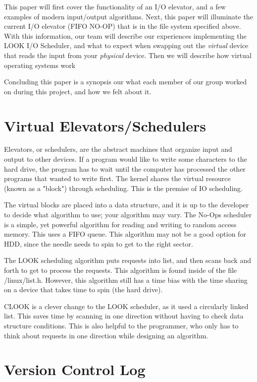\documentclass[onecolumn, draftclsnofoot,10pt, compsoc]{IEEEtran}
\begin{document}
		 This paper will first cover the functionality of an I/O elevator, and a few examples of modern input/output algorithms. 
		 Next, this paper will illuminate the current I/O elevator (FIFO NO-OP) that is in the file system specified above. 
		 With this information, our team will describe our experiences implementing the LOOK I/O Scheduler, and what to expect when swapping out the \textit{virtual} device that reads the input from your \textit{physical} device.
         Then we will describe how virtual operating systems work

		 Concluding this paper is a synopsis our what each member of our group worked on during this project, and how we felt about it.


		 \section{Virtual Elevators/Schedulers}
            Elevators, or schedulers, are the abstract machines that organize input and output to other devices. If a program would like to write some characters to the hard drive, the program has to wait until the computer has processed the other programs that wanted to write first. The kernel shares the virtual resource (known as a "block") through scheduling. This is the premise of IO scheduling.

            The virtual blocks are placed into a data structure, and it is up to the developer to decide what algorithm to use; your algorithm may vary.
            The No-Ops scheduler is a simple, yet powerful algorithm for reading and writing to random access memory. This uses a FIFO queue. This algorithm may not be a good option for HDD, since the needle needs to spin to get to the right sector. 

            The LOOK scheduling algorithm puts requests into list, and then scans back and forth to get to process the requests. This algorithm is found inside of the file /linux/list.h. However, this algorithm still has a time bias with the time sharing on a device that takes time to spin (the hard drive).

            CLOOK is a clever change to the LOOK scheduler, as it used a circularly linked list. This saves time by scanning in one direction without having to check data structure conditions. This is also helpful to the programmer, who only has to think about requests in one direction while designing an algorithm.
            
        \section{Version Control Log}
        
\end{document}
